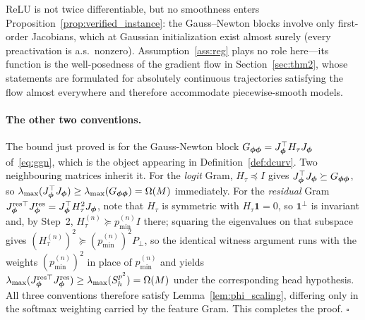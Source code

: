 \begin{remark}
\label{rem:relu_scope}
ReLU is not twice differentiable, but no smoothness enters
Proposition~\ref{prop:verified_instance}: the Gauss--Newton blocks
involve only first-order Jacobians, which at Gaussian
initialization exist almost surely (every preactivation is a.s.\
nonzero). Assumption~\ref{ass:reg} plays no role here---its
function is the well-posedness of the gradient flow in
Section~\ref{sec:thm2}, whose statements are formulated for
absolutely continuous trajectories satisfying the flow almost
everywhere and therefore accommodate piecewise-smooth models.
\end{remark}

\paragraph{The other two conventions.}
The bound just proved is for the Gauss-Newton block
$G_{{\boldsymbol{\phi}}{\boldsymbol{\phi}}} = J_{\boldsymbol{\phi}}^\top H_\tau J_{\boldsymbol{\phi}}$
of~\eqref{eq:ggn}, which is the object appearing in
Definition~\ref{def:dcurv}. Two neighbouring matrices inherit it.
For the \emph{logit} Gram, $H_\tau \preceq I$ gives
$J_{\boldsymbol{\phi}}^\top J_{\boldsymbol{\phi}} \succeq G_{{\boldsymbol{\phi}}{\boldsymbol{\phi}}}$, so
$\lambda_{\max}(J_{\boldsymbol{\phi}}^\top J_{\boldsymbol{\phi}}) \geq
\lambda_{\max}(G_{{\boldsymbol{\phi}}{\boldsymbol{\phi}}}) = \Omega(M)$ immediately. For the
\emph{residual} Gram $J_{\boldsymbol{\phi}}^{\mathrm{res}\top}
J_{\boldsymbol{\phi}}^{\mathrm{res}} = J_{\boldsymbol{\phi}}^\top H_\tau^2 J_{\boldsymbol{\phi}}$, note that
$H_\tau$ is symmetric with $H_\tau \mathbf{1} = 0$, so
$\mathbf{1}^\perp$ is invariant and, by Step~2,
$H_\tau^{(n)} \succeq p^{(n)}_{\min} I$ there; squaring the
eigenvalues on that subspace gives
$(H_\tau^{(n)})^2 \succeq (p^{(n)}_{\min})^2 P_\perp$, so the
identical witness argument runs with the weights
$(p^{(n)}_{\min})^2$ in place of $p^{(n)}_{\min}$ and yields
$\lambda_{\max}(J_{\boldsymbol{\phi}}^{\mathrm{res}\top} J_{\boldsymbol{\phi}}^{\mathrm{res}})
\geq \lambda_{\max}(S_h^{p^2}) = \Omega(M)$ under the corresponding
head hypothesis. All three conventions therefore satisfy
Lemma~\ref{lem:phi_scaling}, differing only in the softmax weighting
carried by the feature Gram. This completes the proof.
\hfill$\square$

